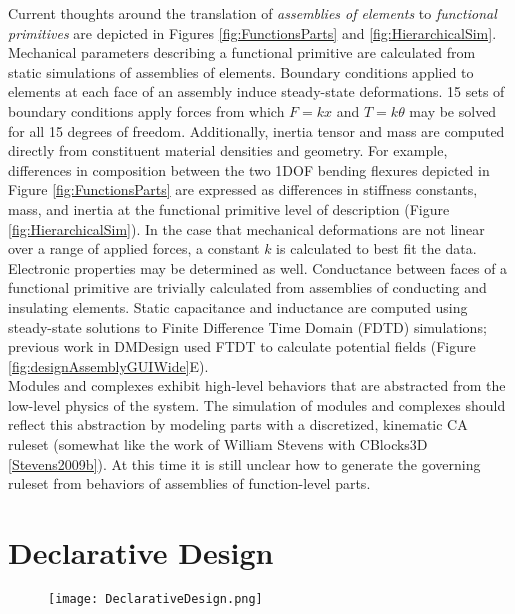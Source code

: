 {Current thoughts around the translation of \textit{assemblies of elements} to \textit{functional primitives} are depicted in Figures \ref{fig:FunctionsParts} and \ref{fig:HierarchicalSim}.  Mechanical parameters describing a functional primitive are calculated from static simulations of assemblies of elements.  Boundary conditions applied to elements at each face of an assembly induce steady-state deformations.  15 sets of boundary conditions apply forces from which $F = kx$ and $T = k\theta$ may be solved for all 15 degrees of freedom.  Additionally, inertia tensor and mass are computed directly from constituent material densities and geometry.  For example, differences in composition between the two 1DOF bending flexures depicted in Figure \ref{fig:FunctionsParts} are expressed as differences in stiffness constants, mass, and inertia at the functional primitive level of description (Figure \ref{fig:HierarchicalSim}).  In the case that mechanical deformations are not linear over a range of applied forces, a constant $k$ is calculated to best fit the data.  \\

Electronic properties may be determined as well.  Conductance between faces of a functional primitive are trivially calculated from assemblies of conducting and insulating elements.  Static capacitance and inductance are computed using steady-state solutions to Finite Difference Time Domain (FDTD) simulations; previous work in DMDesign used FTDT to calculate potential fields (Figure \ref{fig:designAssemblyGUIWide}E).\\

Modules and complexes exhibit high-level behaviors that are abstracted from the low-level physics of the system.  The simulation of modules and complexes should reflect this abstraction by modeling parts with a discretized, kinematic CA ruleset (somewhat like the work of William Stevens with CBlocks3D \ref{Stevens2009b}).  At this time it is still unclear how to generate the governing ruleset from behaviors of assemblies of function-level parts.

\section{Declarative Design}

\begin{figure}
  \texttt{[image: DeclarativeDesign.png]}
  \caption{}
  \label{fig:DeclarativeDesign}
\end{figure}

}
